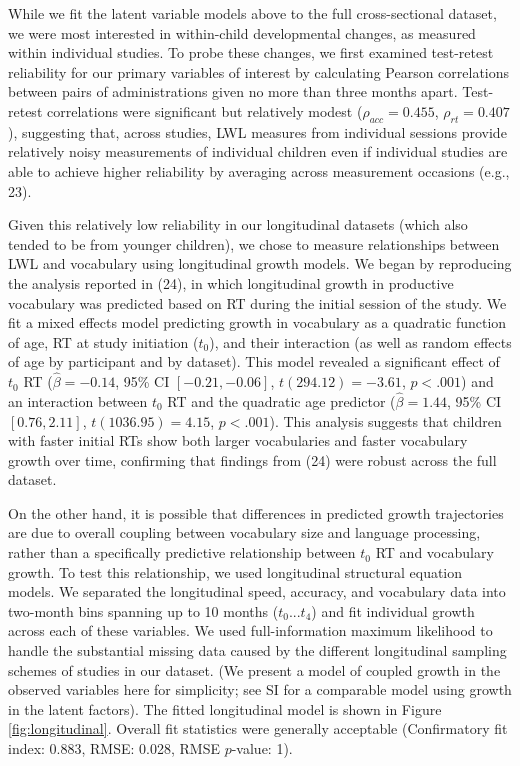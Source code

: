 \documentclass[9pt,twocolumn,twoside,]{pnas-new}
\begin{document}
While we fit the latent variable models above to the full
cross-sectional dataset, we were most interested in within-child
developmental changes, as measured within individual studies. To probe
these changes, we first examined test-retest reliability for our primary
variables of interest by calculating Pearson correlations between pairs
of administrations given no more than three months apart. Test-retest
correlations were significant but relatively modest
(\(\rho_{acc} = 0.455\), \(\rho_{rt} =  0.407\)), suggesting that,
across studies, LWL measures from individual sessions provide relatively
noisy measurements of individual children even if individual studies are
able to achieve higher reliability by averaging across measurement
occasions (e.g., 23).

Given this relatively low reliability in our longitudinal datasets
(which also tended to be from younger children), we chose to measure
relationships between LWL and vocabulary using longitudinal growth
models. We began by reproducing the analysis reported in (24), in which
longitudinal growth in productive vocabulary was predicted based on RT
during the initial session of the study. We fit a mixed effects model
predicting growth in vocabulary as a quadratic function of age, RT at
study initiation (\(t_0\)), and their interaction (as well as random
effects of age by participant and by dataset). This model revealed a
significant effect of \(t_0\) RT (\(\hat{\beta} = -0.14\), 95\% CI
\([-0.21, -0.06]\), \(t(294.12) = -3.61\), \(p < .001\)) and an
interaction between \(t_0\) RT and the quadratic age predictor
(\(\hat{\beta} = 1.44\), 95\% CI \([0.76, 2.11]\),
\(t(1036.95) = 4.15\), \(p < .001\)). This analysis suggests that
children with faster initial RTs show both larger vocabularies and
faster vocabulary growth over time, confirming that findings from (24)
were robust across the full dataset.

On the other hand, it is possible that differences in predicted growth
trajectories are due to overall coupling between vocabulary size and
language processing, rather than a specifically predictive relationship
between \(t_0\) RT and vocabulary growth. To test this relationship, we
used longitudinal structural equation models. We separated the
longitudinal speed, accuracy, and vocabulary data into two-month bins
spanning up to 10 months (\(t_0 ... t_4\)) and fit individual growth
across each of these variables. We used full-information maximum
likelihood to handle the substantial missing data caused by the
different longitudinal sampling schemes of studies in our dataset. (We
present a model of coupled growth in the observed variables here for
simplicity; see SI for a comparable model using growth in the latent
factors). The fitted longitudinal model is shown in Figure
\ref{fig:longitudinal}. Overall fit statistics were generally acceptable
(Confirmatory fit index: 0.883, RMSE: 0.028, RMSE \(p\)-value: 1).
\end{document}
